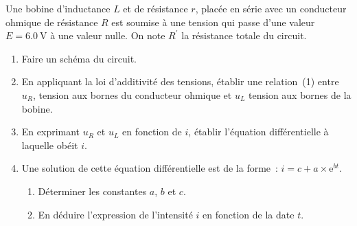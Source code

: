 Une bobine d'inductance $L$ et de résistance $r$, placée en série avec un
conducteur ohmique de résistance $R$ est soumise à une tension qui
passe d'une valeur $E=\qty{6.0}{\V}$ à une valeur nulle. On note $R^{\prime}$ la
résistance totale du circuit.

\begin{enumerate}
    \item Faire un schéma du circuit.
    \item En appliquant la loi d'additivité des tensions, établir une
          relation~(1) entre $u_{R}$, tension aux bornes du conducteur ohmique
          et $u_{L}$ tension aux bornes de la bobine.
    \item En exprimant $u_{R}$ et $u_{L}$ en fonction de $i$, établir
          l'équation différentielle à laquelle obéit $i$.
    \item Une solution de cette équation différentielle est de la forme~:
          $i=c+a\times\mathrm{e}^{bt}$.
          \begin{enumerate}
              \item Déterminer les constantes $a$, $b$ et $c$.
              \item En déduire l'expression de l'intensité $i$ en fonction de la
                    date $t$.
          \end{enumerate}
\end{enumerate}


